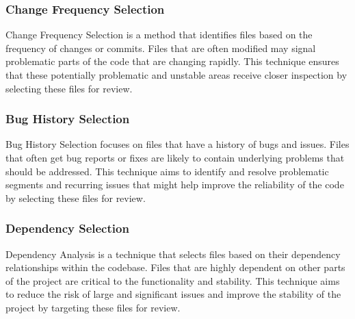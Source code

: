\subsubsection{Change Frequency Selection}
Change Frequency Selection is a method that identifies files based on the frequency of changes or commits. Files that are often modified may signal problematic parts of the code that are changing rapidly. This technique ensures that these potentially problematic and unstable areas receive closer inspection by selecting these files for review. \\

\subsubsection{Bug History Selection}
Bug History Selection focuses on files that have a history of bugs and issues. Files that often get bug reports or fixes are likely to contain underlying problems that should be addressed. This technique aims to identify and resolve problematic segments and recurring issues that might help improve the reliability of the code by selecting these files for review. \\

\subsubsection{Dependency Selection} 
Dependency Analysis is a technique that selects files based on their dependency relationships within the codebase. Files that are highly dependent on other parts of the project are critical to the functionality and stability. This technique aims to reduce the risk of large and significant issues and improve the stability of the project by targeting these files for review.